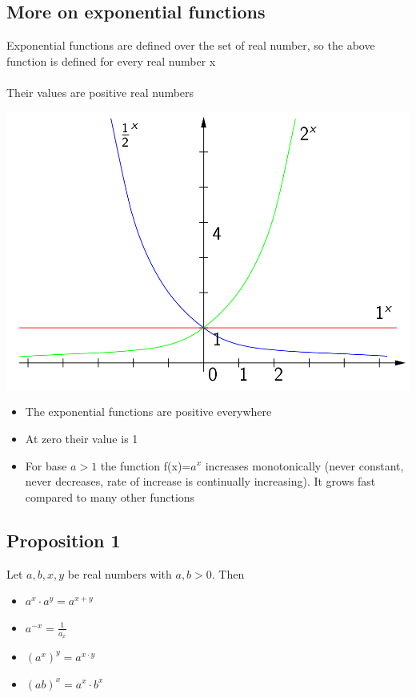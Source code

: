 \documentclass{article}[18pt]
\begin{document}
\subsection{More on exponential functions}
Exponential functions are defined over the set of real number, so the above function is defined for every real number x\\
\\
Their values are positive real numbers\\
\begin{center}
	\includegraphics[scale=0.4]{exponential}
\end{center}
\begin{itemize}
	\item The exponential functions are positive everywhere
	\item At zero their value is 1
	\item For base $a>1$ the function f(x)=$a^x$ increases monotonically (never constant, never decreases, rate of increase is continually increasing). It grows fast compared to many other functions
\end{itemize}
\subsection{Proposition 1}
Let $a,b,x,y$ be real numbers with $a,b>0$. Then
\begin{itemize}
	\item $a^x\cdot a^y=a^{x+y}$
	\item $a^{-x}=\frac{1}{a_x}$
	\item $(a^x)^y=a^{x\cdot y}$
	\item $(ab)^x=a^x\cdot b^x$
\end{itemize}
\end{document}
